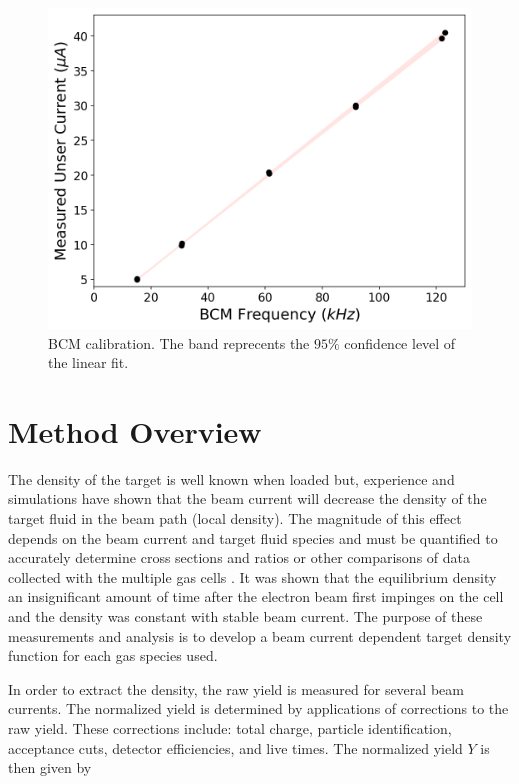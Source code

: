 \documentclass[final,5p,times,twocolumn]{elsarticle}
\begin{document}
\begin{figure}[!h]
      \centering
    \includegraphics[width=\linewidth]{images/dnew_calibration.pdf}
    \caption{BCM calibration. The band reprecents the $95\%$ confidence level of the linear fit.}
    \label{fig:dnew_cal}
\end{figure}


\section{Method Overview}

The density of the target is well known when loaded but, experience and simulations have shown that the beam current will decrease the density of the target fluid in the beam path (local density). The magnitude of this effect depends on the beam current and target fluid species and must be quantified to accurately determine cross sections and ratios or other comparisons of data collected with the multiple gas cells \cite{celldes}. It was shown that the equilibrium density an insignificant amount of time after the electron beam first impinges on the cell and the density was constant with stable beam current. The purpose of these measurements and analysis is to develop a beam current dependent target density function for each gas species used.  

In order to extract the density, the raw yield is measured for several beam currents. The normalized yield is determined by applications of corrections  to the raw yield. These corrections include: total charge, particle identification, acceptance cuts, detector efficiencies, and live times. The normalized yield $Y$ is then given by
\end{document}
